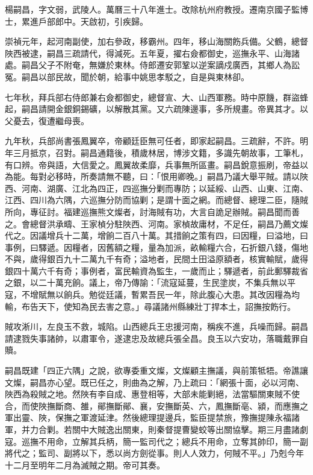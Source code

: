 
\begin{pinyinscope}
楊嗣昌，字文弱，武陵人。萬曆三十八年進士。改除杭州府教授。遷南京國子監博士，累進戶部郎中。天啟初，引疾歸。

崇禎元年，起河南副使，加右參政，移霸州。四年，移山海關飭兵備。父鶴，總督陜西被逮，嗣昌三疏請代，得減死。五年夏，擢右僉都御史，巡撫永平、山海諸處。嗣昌父子不附奄，無嫌於東林。侍郎遷安郭鞏以逆案謫戍廣西，其鄉人為訟冤。嗣昌以部民故，聞於朝，給事中姚思孝駁之，自是與東林卻。

七年秋，拜兵部右侍郎兼右僉都御史，總督宣、大、山西軍務。時中原饑，群盜蜂起，嗣昌請開金銀銅錫礦，以解散其黨。又六疏陳邊事，多所規畫。帝異其才。以父憂去，復遭繼母喪。

九年秋，兵部尚書張鳳翼卒，帝顧廷臣無可任者，即家起嗣昌。三疏辭，不許。明年三月抵京，召對。嗣昌通籍後，積歲林居，博涉文籍，多識先朝故事，工筆札，有口辨。帝與語，大信愛之。鳳翼故柔靡，兵事無所區畫。嗣昌銳意振刷，帝益以為能。每對必移時，所奏請無不聽，曰：「恨用卿晚。」嗣昌乃議大舉平賊。請以陜西、河南、湖廣、江北為四正，四巡撫分剿而專防；以延綏、山西、山東、江南、江西、四川為六隅，六巡撫分防而協剿；是謂十面之網。而總督、總理二臣，隨賊所向，專征討。福建巡撫熊文燦者，討海賊有功，大言自詭足辦賊。嗣昌聞而善之。會總督洪承疇、王家楨分駐陜西、河南。家楨故庸材，不足任，嗣昌乃薦文燦代之。因議增兵十二萬，增餉二百八十萬。其措餉之策有四，曰因糧，曰溢地，曰事例，曰驛遞。因糧者，因舊額之糧，量為加派，畝輸糧六合，石折銀八錢，傷地不與，歲得銀百九十二萬九千有奇；溢地者，民間土田溢原額者，核實輸賦，歲得銀四十萬六千有奇；事例者，富民輸資為監生，一歲而止；驛遞者，前此郵驛裁省之銀，以二十萬充餉。議上，帝乃傳諭：「流寇延蔓，生民塗炭，不集兵無以平寇，不增賦無以餉兵。勉從廷議，暫累吾民一年，除此腹心大患。其改因糧為均輸，布告天下，使知為民去害之意。」尋議諸州縣練壯丁捍本土，詔撫按飭行。

賊攻淅川，左良玉不救，城陷。山西總兵王忠援河南，稱疾不進，兵噪而歸。嗣昌請逮戮失事諸帥，以肅軍令，遂逮忠及故總兵張全昌。良玉以六安功，落職戴罪自贖。

嗣昌既建「四正六隅」之說，欲專委重文燦，文燦顧主撫議，與前策牴牾。帝譙讓文燦，嗣昌亦心望。既已任之，則曲為之解，乃上疏曰：「網張十面，必以河南、陜西為殺賊之地。然陜有李自成、惠登相等，大部未能剿絕，法當驅關東賊不使合，而使陜撫斷商、雒，鄖撫斷鄖、襄，安撫斷英、六，鳳撫斷亳、潁，而應撫之軍出靈、陜，保撫之軍渡延津。然後總理提邊兵，監臣提禁旅，豫撫提陳永福諸軍，并力合剿。若關中大賊逸出關東，則秦督提曹變蛟等出關協擊。期三月盡諸劇寇。巡撫不用命，立解其兵柄，簡一監司代之；總兵不用命，立奪其帥印，簡一副將代之；監司、副將以下，悉以尚方劍從事。則人人效力，何賊不平。」乃剋今年十二月至明年二月為滅賊之期。帝可其奏。


\end{pinyinscope}
